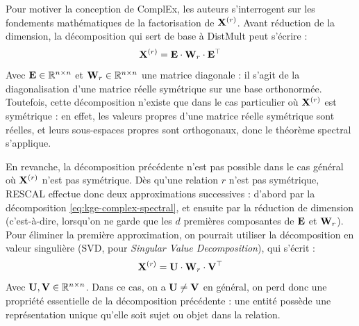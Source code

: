 Pour motiver la conception de ComplEx, les auteurs s'interrogent sur les fondements mathématiques de la factorisation de $\bf{X}^{(r)}$. Avant réduction de la dimension, la décomposition qui sert de base à DistMult peut s'écrire :
\begin{equation}
    \bf{X}^{(r)} = \bf{E} \cdot \bf{W}_r \cdot \bf{E}^\top
    \label{eq:kge-complex-spectral}
\end{equation}
Avec $\bf{E} \in \R^{n \times n}$ et $\bf{W}_r \in \R^{n \times n}$ une matrice diagonale : il s'agit de la diagonalisation d'une matrice réelle symétrique sur une base orthonormée. Toutefois, cette décomposition n'existe que dans le cas particulier où $\bf{X}^{(r)}$ est symétrique : en effet, les valeurs propres d'une matrice réelle symétrique sont réelles, et leurs sous-espaces propres sont orthogonaux, donc le théorème spectral s'applique.

En revanche, la décomposition précédente n'est pas possible dans le cas général où $\bf{X}^{(r)}$ n'est pas symétrique. Dès qu'une relation $r$ n'est pas symétrique, RESCAL effectue donc deux approximations successives : d'abord par la décomposition \ref{eq:kge-complex-spectral}, et ensuite par la réduction de dimension (c'est-à-dire, lorsqu'on ne garde que les $d$ premières composantes de $\bf{E}$ et $\bf{W}_r$). Pour éliminer la première approximation, on pourrait utiliser la décomposition en valeur singulière (SVD, pour \textit{Singular Value Decomposition}), qui s'écrit :
\begin{equation}
    \bf{X}^{(r)} = \bf{U} \cdot \bf{W}_r \cdot \bf{V}^\top
\end{equation}
Avec $\bf{U}, \bf{V} \in \R^{n \times n}$. Dans ce cas, on a $\bf{U \neq V}$ en général, on perd donc une propriété essentielle de la décomposition précédente : une entité possède une représentation unique qu'elle soit sujet ou objet dans la relation. 

